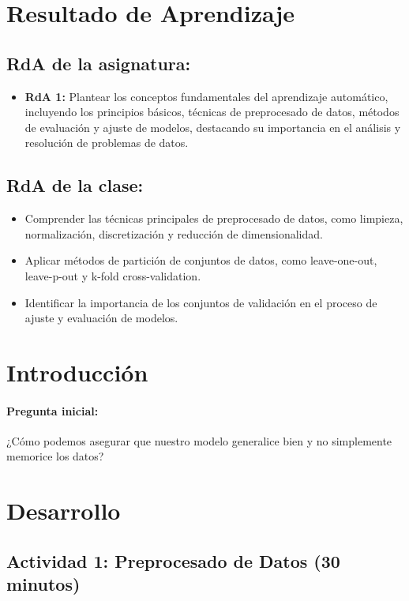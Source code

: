 \documentclass[a4,11pt]{aleph-notas}
\begin{document}
\encabezado


\section*{Resultado de Aprendizaje}

\subsection*{RdA de la asignatura:}
\begin{itemize}
    \item \textbf{RdA 1:} 
    Plantear los conceptos fundamentales del aprendizaje automático, incluyendo los principios básicos, técnicas de preprocesado de datos, métodos de evaluación y ajuste de modelos, destacando su importancia en el análisis y resolución de problemas de datos.
\end{itemize}

\subsection*{RdA de la clase:}
\begin{itemize}
    \item Comprender las técnicas principales de preprocesado de datos, como limpieza, normalización, discretización y reducción de dimensionalidad.
    \item Aplicar métodos de partición de conjuntos de datos, como leave-one-out, leave-p-out y k-fold cross-validation.
    \item Identificar la importancia de los conjuntos de validación en el proceso de ajuste y evaluación de modelos.
\end{itemize}

\section*{Introducción}

\paragraph{Pregunta inicial:} 
¿Cómo podemos asegurar que nuestro modelo generalice bien y no simplemente memorice los datos?


\section*{Desarrollo}

\subsection*{Actividad 1: Preprocesado de Datos (30 minutos)}  
\end{document}
